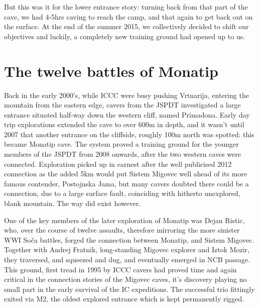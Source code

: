 But this was it for the lower entrance story: turning back from that part of the cave, we had 4-5hrs caving to reach the camp, and that again to get back out on the surface. At the end of the summer 2015, we collectively decided to shift our objectives and luckily, a completely new training ground had opened up to us.

\section{The twelve battles of Monatip}
Back in the early 2000’s, while ICCC were busy pushing Vrtnarija, entering the mountain from the eastern edge, cavers from the JSPDT investigated a large entrance situated half-way down the western cliff, named Primadona. Early day trip explorations extended the cave to over 600m in depth, and it wasn’t until 2007 that another entrance  on the cliffside, roughly 100m north was spotted: this became Monatip cave. The system proved a training ground for the younger members of the JSPDT from 2008 onwards, after the two western caves were connected. Exploration picked up in earnest after the well publicised 2012 connection as the added 5km would put Sistem Migovec well ahead of its more famous contender, Postojnska Jama, but many cavers doubted there could be a connection, due to a large surface fault, coinciding with hitherto unexplored, blank mountain. The way did exist however.

One of the key members of the later exploration of Monatip was Dejan Ristic, who, over the course of twelve assaults, therefore mirroring the more sinister WWI Soča battles, forged the connection between Monatip, and Sistem Migovec. Together with Andrej Fratnik, long-standing Migovec explorer and Iztok Mozir, they traversed, and squeezed and dug, and eventually emerged in NCB passage. This ground, first tread in 1995 by ICCC cavers had proved time and again critical in the connection stories of the Migovec caves, it’s discovery playing no small part in the early survival of the IC expeditions. The successful trio fittingly exited via M2, the oldest explored entrance which is kept permanently rigged.

